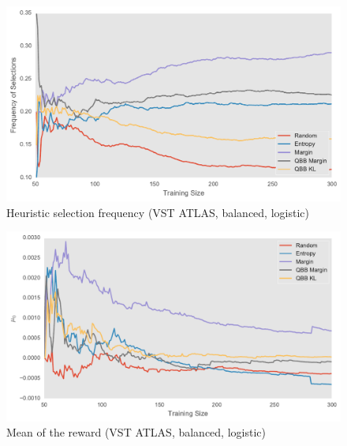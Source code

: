 \begin{figure}[p]
	\centering
	\includegraphics[width=\textwidth]{figures/5_thompson/vstatlas_ul_frequencies}
	\caption[Heuristic selection frequency (VST ATLAS, unbalanced, logistic)]{
		Heuristic selection frequency (VST ATLAS, balanced, logistic)}
	\label{fig:vstatlas_ul_frequencies}
\end{figure}

\begin{figure}[p]
	\centering
	\includegraphics[width=\textwidth]{figures/5_thompson/vstatlas_ul_mus}
	\caption[Mean of the reward (VST ATLAS, unbalanced, logistic)]{
		Mean of the reward (VST ATLAS, balanced, logistic)}
\end{figure}


